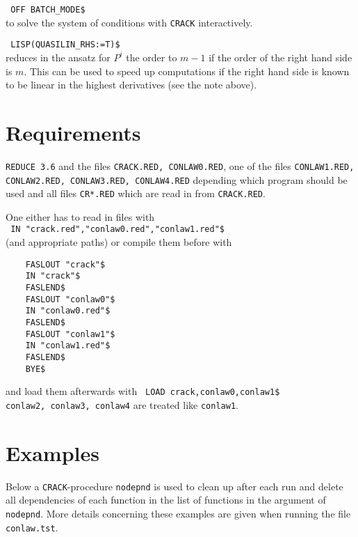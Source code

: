 \documentclass[12pt]{article}
\begin{document}
\verb+ OFF BATCH_MODE$+ \\
to solve the system of conditions with {\tt CRACK} interactively.

\verb+ LISP(QUASILIN_RHS:=T)$+ \\
reduces in the ansatz for $P^i$ the order to $m-1$ if the order of the
right hand side is $m$. This can be used to speed up computations if
the right hand side is known to be linear in the highest derivatives
(see the note above).

\section{Requirements}

{\tt REDUCE 3.6} and 
the files {\tt CRACK.RED, CONLAW0.RED}, one of the files
{\tt CONLAW1.RED, CONLAW2.RED, CONLAW3.RED, CONLAW4.RED} depending which
program should be used and all files {\tt CR*.RED} which 
are read in from {\tt CRACK.RED}.

One either has to read in files with \\
\verb+ IN "crack.red","conlaw0.red","conlaw1.red"$+ \\
\noindent (and appropriate paths) or compile them before with

\begin{verbatim}
    FASLOUT "crack"$
    IN "crack"$
    FASLEND$
    FASLOUT "conlaw0"$
    IN "conlaw0.red"$
    FASLEND$
    FASLOUT "conlaw1"$
    IN "conlaw1.red"$
    FASLEND$
    BYE$
\end{verbatim}
and load them afterwards with \verb+ LOAD crack,conlaw0,conlaw1$+ \\
\verb+conlaw2, conlaw3, conlaw4+ are treated like {\tt conlaw1}.

\section{Examples}
Below a {\tt CRACK}-procedure {\tt nodepnd} is used to clean up 
after each run and delete all dependencies of each 
function in the list of functions in the argument of {\tt nodepnd}.
More details concerning these examples are given when running
the file {\tt conlaw.tst}.
\end{document}
